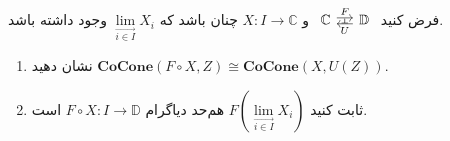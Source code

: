 فرض کنید
$
  \begin{tikzcd}[sep=small]
      \mathbb{C}\arrow[r, shift left=.5ex, "F"{name=F}] & \mathbb{D}\arrow[l, shift left=.5ex, "U"{name=U}]
      \arrow[phantom, from=U, to=F, , "\scriptscriptstyle\boldsymbol{\bot}"]
  \end{tikzcd}
$
و $X : I \to \mathbb{C}$ چنان باشد که $\lim\limits_{\overrightarrow{i \in I}} X_i$ وجود داشته باشد.
\begin{enumerate}[label=(\harfi*)]
  \item نشان دهید $\mathbf{CoCone}(F \circ X, Z) \cong \mathbf{CoCone}(X, U(Z))$.
  \item ثابت کنید $F(\lim\limits_{\overrightarrow{i \in I}} X_i)$ هم‌حد دیاگرام $F \circ X : I \to \mathbb{D}$ است.
\end{enumerate}